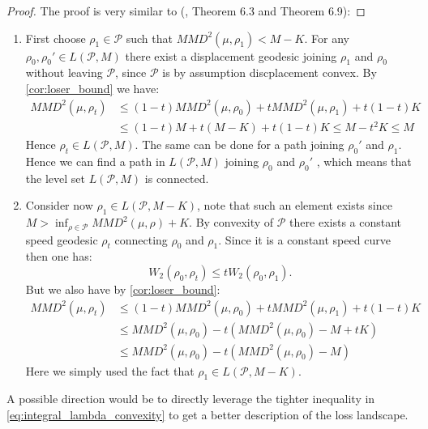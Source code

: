 %
\begin{proof}
The proof is very similar to (\cite{Bottou:2017}, Theorem 6.3 and
Theorem 6.9): 
\end{proof}
\begin{enumerate}
\item First choose $\rho_{1}\in\mathcal{P}$ such that $MMD^{2}(\mu,\rho_{1})<M-K$.
For any $\rho_{0},\rho_{0}'\in L(\mathcal{P},M)$ there exist a displacement
geodesic joining $\rho_{1}$ and $\rho_{0}$ without leaving $\mathcal{P}$,
since $\mathcal{P}$ is by assumption discplacement convex. By \ref{cor:loser_bound}
we have:
\begin{align*}
MMD^{2}(\mu,\rho_{t}) & \leq(1-t)MMD^{2}(\mu,\rho_{0})+tMMD^{2}(\mu,\rho_{1})+t(1-t)K\\
 & \leq(1-t)M+t(M-K)+t(1-t)K\leq M-t^{2}K\leq M
\end{align*}
Hence $\rho_{t}\in L(\mathcal{P},M)$. The same can be done for a
path joining $\rho_{0}'$ and $\rho_{1}$. Hence we can find a path
in $L(\mathcal{P},M)$ joining $\rho_{0}$ and $\rho_{0}'$ , which
means that the level set $L(\mathcal{P},M)$ is connected.
\item Consider now $\rho_{1}\in L(\mathcal{P},M-K)$, note that such an
element exists since $M>\inf_{\rho\in\mathcal{P}}MMD^{2}(\mu,\rho)+K$.
By convexity of $\mathcal{P}$ there exists a constant speed geodesic
$\rho_{t}$ connecting $\rho_{0}$ and $\rho_{1}$. Since it is a
constant speed curve then one has:
\[
W_{2}(\rho_{0},\rho_{t})\leq tW_{2}(\rho_{0},\rho_{1}).
\]
But we also have by \ref{cor:loser_bound}:
\begin{align*}
MMD^{2}(\mu,\rho_{t}) & \leq(1-t)MMD^{2}(\mu,\rho_{0})+tMMD^{2}(\mu,\rho_{1})+t(1-t)K\\
 & \leq MMD^{2}(\mu,\rho_{0})-t(MMD^{2}(\mu,\rho_{0})-M+tK)\\
 & \leq MMD^{2}(\mu,\rho_{0})-t(MMD^{2}(\mu,\rho_{0})-M)
\end{align*}
Here we simply used the fact that $\rho_{1}\in L(\mathcal{P},M-K)$. 
\end{enumerate}
%

\begin{remark}
	A possible direction would be to directly leverage the tighter inequality in \ref{eq:integral_lambda_convexity} to get a better description of the loss landscape.
\end{remark}

